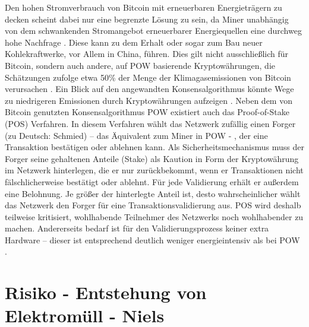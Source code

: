 		Den hohen Stromverbrauch von Bitcoin mit erneuerbaren Energieträgern zu decken scheint dabei nur eine begrenzte Lösung zu sein, da Miner unabhängig von dem schwankenden Stromangebot erneuerbarer Energiequellen eine durchweg hohe Nachfrage \cite{de_vries_renewable_2019}. Diese kann zu dem Erhalt oder sogar zum Bau neuer Kohlekraftwerke, vor Allem in China, führen. Dies gilt nicht ausschließlich für Bitcoin, sondern auch andere, auf POW basierende Kryptowährungen, die Schätzungen zufolge etwa 50\% der Menge der Klimagasemissionen von Bitcoin verursachen \cite{gallersdorfer_energy_2020}. Ein Blick auf den angewandten Konsensalgorithmus könnte Wege zu niedrigeren Emissionen durch Kryptowährungen aufzeigen \cite{de_vries_renewable_2019}\cite{schinckus_good_2020}. \newline
		Neben dem von Bitcoin genutzten Konsensalgorithmus POW existiert auch das Proof-of-Stake (POS) Verfahren. In diesem Verfahren wählt das Netzwerk zufällig einen Forger (zu Deutsch: Schmied) – das Äquivalent zum Miner in POW - , der eine Transaktion bestätigen oder ablehnen kann. Als Sicherheitsmechanismus muss der Forger seine gehaltenen Anteile (Stake) als Kaution in Form der Kryptowährung im Netzwerk hinterlegen, die er nur zurückbekommt, wenn er Transaktionen nicht fälschlicherweise bestätigt oder ablehnt. Für jede Validierung erhält er außerdem eine Belohnung. Je größer der hinterlegte Anteil ist, desto wahrscheinlicher wählt das Netzwerk den Forger für eine Transaktionsvalidierung aus. POS wird deshalb teilweise kritisiert, wohlhabende Teilnehmer des Netzwerks noch wohlhabender zu machen. Andererseits bedarf ist für den Validierungsprozess keiner extra Hardware – dieser ist entsprechend deutlich weniger energieintensiv als bei POW \cite{adam_konsensmodelle_2020}\cite{schinckus_good_2020}. 
\section{Risiko - Entstehung von Elektromüll - Niels}


